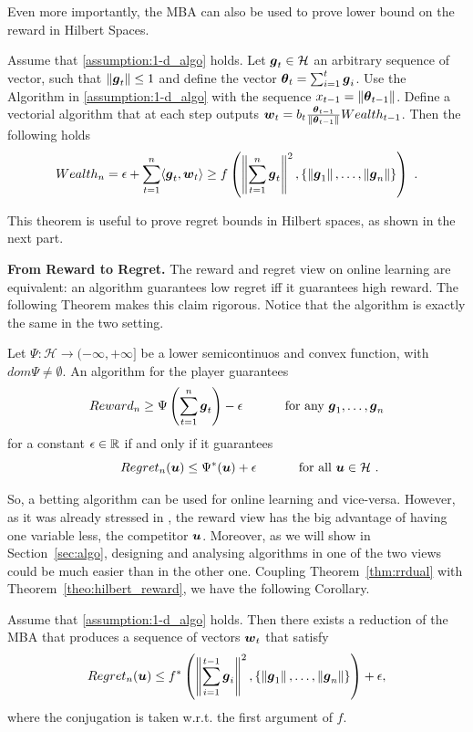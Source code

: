 Even more importantly, the \ac{MBA} can also be used to prove lower bound on the reward in Hilbert Spaces.
\begin{theorem}
\label{theo:hilbert_reward}
  Assume that \ref{assumption:1-d_algo} holds.
  Let $\boldsymbol{g}_t \in \mathcal{H}$ an arbitrary sequence of vector, such that $\left\|{\boldsymbol{g}_t}\right\| \leq 1$ and define the vector ${\boldsymbol{\theta}}_t=\sum_{i=1}^{t} \boldsymbol{g}_i$.
  Use the Algorithm in \ref{assumption:1-d_algo} with the sequence $x_{t-1}= \left\|{{\boldsymbol{\theta}}_{t-1}}\right\|$.
  Define a vectorial algorithm that at each step outputs $\boldsymbol{w}_t = b_t \frac{{\boldsymbol{\theta}}_{t-1}}{\left\|{{\boldsymbol{\theta}}_{t-1}}\right\|} Wealth_{t-1}$. Then the following holds
  \[
  Wealth_{n} = \epsilon + \sum_{t=1}^n \langle \boldsymbol{g}_t, \boldsymbol{w}_t \rangle \geq f\left( \left\|{\sum_{t=1}^n \boldsymbol{g}_t}\right\|^2, \left\{\left\|{\boldsymbol{g}_1}\right\|, \ldots, \left\|{\boldsymbol{g}_n}\right\|\right\}\right)~.
  \]
\end{theorem}
This theorem is useful to prove regret bounds in Hilbert spaces, as shown in the next part.

\vspace{0.2cm}\noindent\textbf{From Reward to Regret.}
The reward and regret view on online learning are equivalent: an algorithm guarantees low regret iff it guarantees high reward. The following Theorem makes this claim rigorous. Notice that the algorithm is exactly the same in the two setting.
\begin{theorem}
  \label{thm:rrdual}
  Let $\Psi:\mathcal{H} \rightarrow (-\infty, +\infty]$ be a lower semicontinuos and convex function, with $dom \Psi \neq \emptyset$. An
  algorithm for the player guarantees
  \[
  Reward_n \geq \Psi\left(\sum_{t=1}^n \boldsymbol{g}_t\right) - \epsilon \quad \quad \quad \textnormal{ for any } \boldsymbol{g}_1, \dots, \boldsymbol{g}_n
  \]
  for a constant $\epsilon \in \mathbb{R}$ if and only if it
  guarantees
  \begin{equation}\label{eq:regb}
  \qquad Regret_n(\boldsymbol{u}) \leq \Psi^*(\boldsymbol{u}) + \epsilon \quad \quad \quad \textnormal{ for all } \boldsymbol{u} \in \mathcal{H}~.
  \end{equation}
\end{theorem}
So, a betting algorithm can be used for online learning and vice-versa. However, as it was already stressed in \citet{McMahanO14}, the reward view has the big advantage of having one variable less, the competitor $\boldsymbol{u}$.
Moreover, as we will show in Section~\ref{sec:algo}, designing and analysing algorithms in one of the two views could be much easier than in the other one.
Coupling Theorem~\ref{thm:rrdual} with Theorem~\ref{theo:hilbert_reward}, we have the following Corollary.
\begin{cor}
\label{theo:hilbert_regret}
Assume that \ref{assumption:1-d_algo} holds. Then there exists a reduction of the \ac{MBA} that produces a sequence of vectors $\boldsymbol{w}_t$ that satisfy
\[
Regret_n(\boldsymbol{u}) \leq f^*\left( \left\|{\sum_{i=1}^{t-1} \boldsymbol{g}_i}\right\|^2, \left\{\left\|{\boldsymbol{g}_1}\right\|, \ldots, \left\|{\boldsymbol{g}_n}\right\|\right\}\right)+\epsilon,
\]
where the conjugation is taken w.r.t. the first argument of $f$.
\end{cor}

